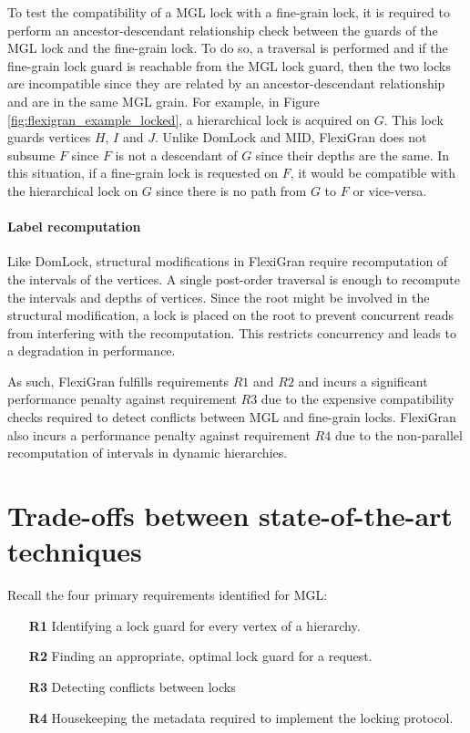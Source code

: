 To test the compatibility of a MGL lock with a fine-grain lock, it is required to perform an ancestor-descendant relationship check between the guards of the MGL lock and the fine-grain lock. To do so, a traversal is performed and if the fine-grain lock guard is reachable from the MGL lock guard, then the two locks are incompatible since they are related by an ancestor-descendant relationship and are in the same MGL grain. 
For example, in Figure \ref{fig:flexigran_example_locked}, a hierarchical lock is acquired on $G$. This lock guards vertices $H$, $I$ and $J$. Unlike DomLock and MID, FlexiGran does not subsume $F$ since $F$ is not a descendant of $G$ since their depths are the same. In this situation, if a fine-grain lock is requested on $F$, it would be compatible with the hierarchical lock on $G$ since there is no path from $G$ to $F$ or vice-versa.

\paragraph{Label recomputation}
Like DomLock, structural modifications in FlexiGran require recomputation of the intervals of the vertices. A single post-order traversal is enough to recompute the intervals and depths of vertices. Since the root might be involved in the structural modification, a lock is placed on the root to prevent concurrent reads from interfering with the recomputation. This restricts concurrency and leads to a degradation in performance. 

As such, FlexiGran fulfills requirements $R1$ and $R2$ and incurs a significant performance penalty against requirement $R3$ due to the expensive compatibility checks required to detect conflicts between MGL and fine-grain locks. FlexiGran also incurs a performance penalty against requirement $R4$ due to the non-parallel recomputation of intervals in dynamic hierarchies.



\section{Trade-offs between state-of-the-art techniques}

Recall the four primary requirements identified for MGL:
\begin{itemize}
    \item[\textbf{R1}] Identifying a lock guard for every vertex of a hierarchy.
    \item[\textbf{R2}] Finding an appropriate, optimal lock guard for a request.
    \item[\textbf{R3}] Detecting conflicts between locks
    \item[\textbf{R4}] Housekeeping the metadata required to implement the locking protocol.
\end{itemize}

